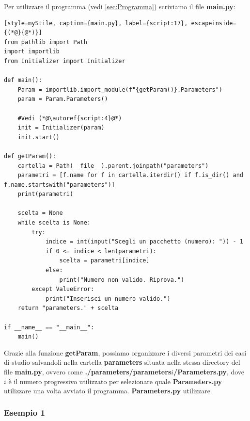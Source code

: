 Per utilizzare il programma (vedi \autoref{sec:Programma}) scriviamo il file \textbf{main.py}:
\begin{lstlisting}[style=myStile, caption={main.py}, label={script:17}, escapeinside={(*@}{@*)}]
from pathlib import Path
import importlib
from Initializer import Initializer

def main():
    Param = importlib.import_module(f"{getParam()}.Parameters")
    param = Param.Parameters()
    
    #Vedi (*@\autoref{script:4}@*)
    init = Initializer(param)
    init.start()

def getParam():
    cartella = Path(__file__).parent.joinpath("parameters")
    parametri = [f.name for f in cartella.iterdir() if f.is_dir() and f.name.startswith("parameters")]
    print(parametri)
    
    scelta = None
    while scelta is None:
        try:
            indice = int(input("Scegli un pacchetto (numero): ")) - 1
            if 0 <= indice < len(parametri):
                scelta = parametri[indice]
            else:
                print("Numero non valido. Riprova.")
        except ValueError:
            print("Inserisci un numero valido.")
    return "parameters." + scelta

if __name__ == "__main__":
    main()
\end{lstlisting}
Grazie alla funzione \textbf{getParam}, possiamo organizzare i diversi parametri dei casi di studio salvandoli nella cartella \textbf{parameters}
situata nella stessa directory del file \textbf{main.py}, ovvero come \textbf{./parameters/parameters$i$/Parameters.py}, dove $i$ è il numero progressivo 
utilizzato per selezionare quale \textbf{Parameters.py} utilizzare una volta avviato il programma.
\textbf{Parameters.py} utilizzare.

\subsubsection{Esempio 1}
\label{subsubsec:Es1}

